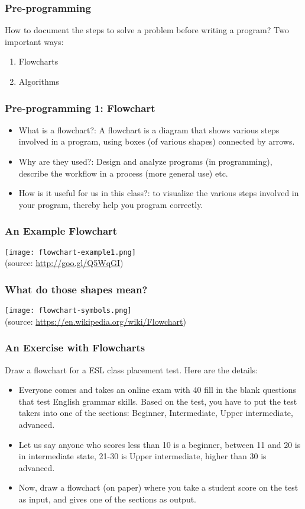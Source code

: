 \documentclass{beamer}
\begin{document}
\begin{frame}
\frametitle{Pre-programming}
How to document the steps to solve a problem before writing a program? Two important ways:
\begin{enumerate}
\item Flowcharts
\item Algorithms
\end{enumerate}
\end{frame}

\begin{frame}%
\frametitle{Pre-programming 1: Flowchart}
\begin{itemize}
\item What is a flowchart?: A flowchart is a diagram that shows various steps involved in a program, using boxes (of various shapes) connected by arrows. \pause
\item Why are they used?: Design and analyze programs (in programming), describe the workflow in a process (more general use) etc. \pause
\item How is it useful for us in this class?: to visualize the various steps involved in your program, thereby help you program correctly. 
\end{itemize}
\end{frame}

\begin{frame}
\frametitle{An Example Flowchart}
\texttt{[image: flowchart-example1.png]}
\medskip \\ (source: \url{http://goo.gl/Q5WqGI})
\end{frame}

\begin{frame}
\frametitle{What do those shapes mean?}
\texttt{[image: flowchart-symbols.png]}
\medskip \\ (source: \url{https://en.wikipedia.org/wiki/Flowchart})
\end{frame}

\begin{frame}
\frametitle{An Exercise with Flowcharts}
Draw a flowchart for a ESL class placement test. Here are the details:

\begin{itemize}
\item Everyone comes and takes an online exam with 40 fill in the blank questions that test English grammar skills. Based on the test, you have to put the test takers into one of the sections: Beginner, Intermediate, Upper intermediate, advanced. 
\pause
\item Let us say anyone who scores less than 10 is a beginner, between 11 and 20 is in intermediate state, 21-30 is Upper intermediate, higher than 30 is advanced. 
\item Now, draw a flowchart (on paper) where you take a student score on the test as input, and gives one of the sections as output.
\end{itemize}
\end{frame}
\end{document}
